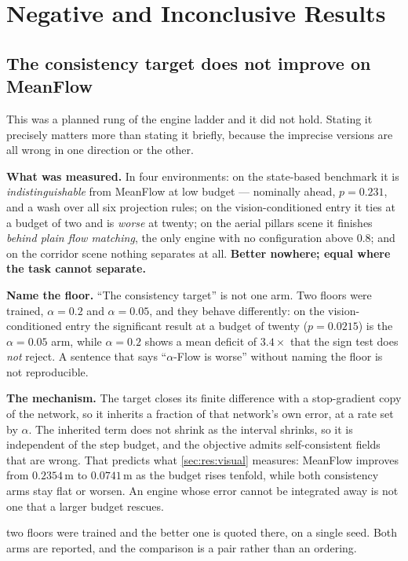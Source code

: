 \section{Negative and Inconclusive Results}\label{sec:disc:negative}

\subsection*{The consistency target does not improve on MeanFlow}

This was a planned rung of the engine ladder and it did not hold. Stating it precisely matters more
than stating it briefly, because the imprecise versions are all wrong in one direction or the other.

\textbf{What was measured.} In four environments: on the state-based benchmark it is
\emph{indistinguishable} from MeanFlow at low budget --- nominally ahead, $p = 0.231$, and a wash
over all six projection rules; on the vision-conditioned entry it ties at a budget of two and is
\emph{worse} at twenty; on the aerial pillars scene it finishes \emph{behind plain flow matching},
the only engine with no configuration above $0.8$; and on the corridor scene nothing separates at
all. \textbf{Better nowhere; equal where the task cannot separate.}

\textbf{Name the floor.} ``The consistency target'' is not one arm. Two floors were trained,
$\alpha = 0.2$ and $\alpha = 0.05$, and they behave differently: on the vision-conditioned entry the
significant result at a budget of twenty ($p = 0.0215$) is the $\alpha = 0.05$ arm, while
$\alpha = 0.2$ shows a mean deficit of $3.4\times$ that the sign test does \emph{not} reject. A
sentence that says ``$\alpha$-Flow is worse'' without naming the floor is not reproducible.

\textbf{The mechanism.} The target closes its finite difference with a stop-gradient copy of the
network, so it inherits a fraction of that network's own error, at a rate set by $\alpha$. The
inherited term does not shrink as the interval shrinks, so it is independent of the step budget, and
the objective admits self-consistent fields that are wrong. That predicts what
\autoref{sec:res:visual} measures: MeanFlow improves from $0.2354$\,m to
$0.0741$\,m as the budget rises tenfold, while both consistency arms stay flat or worsen. An
engine whose error cannot be integrated away is not one that a larger budget rescues.

 two floors were trained and the
better one is quoted there, on a single seed. Both arms are reported, and the comparison is a pair
rather than an ordering.

